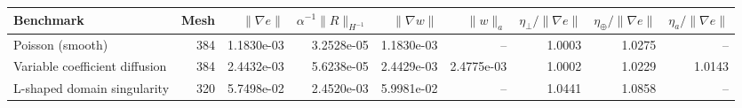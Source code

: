 \begin{tabular}{lrrrrrrrr}
\toprule
Benchmark & Mesh & $\|\nabla e\|$ & $\alpha^{-1}\|R\|_{H^{-1}}$ & $\|\nabla w\|$ & $\|w\|_a$ & $\eta_\perp/\|\nabla e\|$ & $\eta_\oplus/\|\nabla e\|$ & $\eta_a/\|\nabla e\|$ \\
\midrule
Poisson (smooth) & 384 & 1.1830e-03 & 3.2528e-05 & 1.1830e-03 & -- & 1.0003 & 1.0275 & -- \\
Variable coefficient diffusion & 384 & 2.4432e-03 & 5.6238e-05 & 2.4429e-03 & 2.4775e-03 & 1.0002 & 1.0229 & 1.0143 \\
L-shaped domain singularity & 320 & 5.7498e-02 & 2.4520e-03 & 5.9981e-02 & -- & 1.0441 & 1.0858 & -- \\
\bottomrule
\end{tabular}
